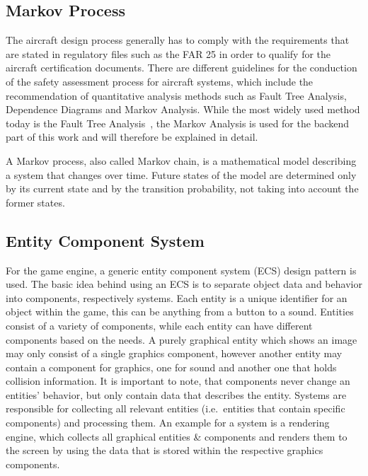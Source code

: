 \subsection{Markov Process}\label{subsec:markov-process}
The aircraft design process generally has to comply with the requirements that are stated in regulatory files such as the FAR 25
in order to qualify for the aircraft certification documents.
There are different guidelines for the conduction of the safety assessment process for aircraft systems, which include the
recommendation of quantitative analysis methods such as Fault Tree Analysis, Dependence Diagrams and Markov Analysis.
While the most widely used method today is the Fault Tree Analysis~\cite{7447967}, the Markov Analysis is used for the backend
part of this work and will therefore be explained in detail.

A Markov process, also called Markov chain, is a mathematical model describing a system that changes over time.
Future states of the model are determined only by its current state and by the transition probability, not taking into account
the former states. 

\subsection{Entity Component System}\label{subsec:entity-component-system}
For the game engine, a generic entity component system (ECS) design pattern is used.
The basic idea behind using an ECS is to separate object data and behavior into components, respectively systems.
Each entity is a unique identifier for an object within the game, this can be anything from a button to a sound.
Entities consist of a variety of components, while each entity can have different components based on the needs.
A purely graphical entity which shows an image may only consist of a single graphics component, however another entity may contain
a component for graphics, one for sound and another one that holds collision information.
It is important to note, that components never change an entities' behavior, but only contain data that describes the entity.
Systems are responsible for collecting all relevant entities (i.e.\ entities that contain specific components) and processing them.
An example for a system is a rendering engine, which collects all graphical entities \& components and renders them to the screen by
using the data that is stored within the respective graphics components.